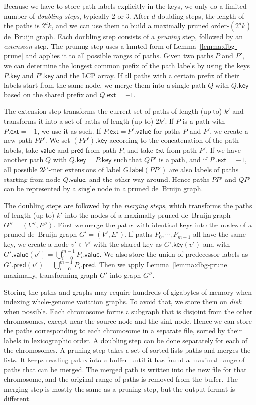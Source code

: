 \documentclass[a4paper,UKenglish]{lipics-v2016}
\newcommand{\glabel}{\ensuremath{\mathsf{label}}}
\newcommand{\gpred}{\ensuremath{\mathsf{pred}}}
\newcommand{\gkey}{\ensuremath{\mathsf{key}}}
\newcommand{\gvalue}{\ensuremath{\mathsf{value}}}
\newcommand{\gext}{\ensuremath{\mathsf{ext}}}
\newcommand{\kmer}[1]{$#1$\nobreakdash-mer}
\newcommand{\orderk}[1]{order\nobreakdash-$#1$}
\begin{document}
Because we have to store path labels explicitly in the keys, we only do a limited number of \emph{doubling steps}, typically $2$ or $3$. After $d$ doubling steps, the length of the paths is $2^{d} k$, and we can use them to build a maximally pruned \orderk{(2^{d} k)} de~Bruijn graph. Each doubling step consists of a \emph{pruning} step, followed by an \emph{extension} step. The pruning step uses a limited form of Lemma~\ref{lemma:dbg-prune} and applies it to all possible ranges of paths. Given two paths $P$ and $P'$, we can determine the longest common prefix of the path labels by using the keys $P.\gkey$ and $P'.\gkey$ and the LCP array. If all paths with a certain prefix of their labels start from the same node, we merge them into a single path $Q$ with $Q.\gkey$ based on the shared prefix and $Q.\gext = -1$.

The extension step transforms the current set of paths of length (up to) $k'$ and transforms it into a set of paths of length (up to) $2k'$. If $P$ is a path with $P.\gext = -1$, we use it as such. If $P.\gext = P'.\gvalue$ for paths $P$ and $P'$, we create a new path $PP'$. We set $(PP').\gkey$ according to the concatenation of the path labels, take $\gvalue$ and $\gpred$ from path $P$, and take $\gext$ from path $P'$. If we have another path $Q$ with $Q.\gkey = P.\gkey$ such that $QP'$ is a path, and if $P'.\gext = -1$, all possible \kmer{2k'} extensions of label $G.\glabel(PP')$ are also labels of paths starting from node $Q.\gvalue$, and the other way around. Hence paths $PP'$ and $QP'$ can be represented by a single node in a pruned de~Bruijn graph.

The doubling steps are followed by the \emph{merging steps}, which transforms the paths of length (up to) $k'$ into the nodes of a maximally pruned de~Bruijn graph $G'' = (V'', E'')$. First we merge the paths with identical keys into the nodes of a pruned de~Bruijn graph $G' = (V', E')$. If paths $P_{0}, \dotsm, P_{m-1}$ all have the same key, we create a node $v' \in V'$ with the shared key as $G'.\gkey(v')$ and with $G'.\gvalue(v') = \bigcup_{i=0}^{m-1} P_{i}.\gvalue$. We also store the union of predecessor labels as $G'.\gpred(v') = \bigcup_{i=0}^{m-1} P_{i}.\gpred$. Then we apply Lemma~\ref{lemma:dbg-prune} maximally, transforming graph $G'$ into graph $G''$.

Storing the paths and graphs may require hundreds of gigabytes of memory when indexing whole-genome variation graphs. To avoid that, we store them on \emph{disk} when possible. Each chromosome forms a subgraph that is disjoint from the other chromosomes, except near the source node and the sink node. Hence we can store the paths corresponding to each chromosome in a separate file, sorted by their labels in lexicographic order. A doubling step can be done separately for each of the chromosomes. A pruning step takes a set of sorted lists paths and merges the lists. It keeps reading paths into a buffer, until it has found a maximal range of paths that can be merged. The merged path is written into the new file for that chromosome, and the original range of paths is removed from the buffer. The merging step is mostly the same as a pruning step, but the output format is different.
\end{document}
